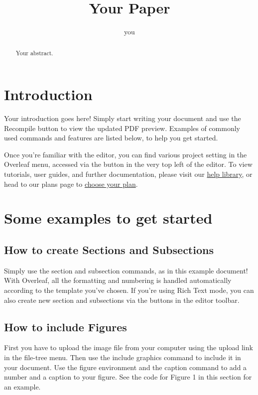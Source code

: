 \documentclass[10pt,english]{article}
\title{Your Paper}
\author{you}
\begin{document}
	 \maketitle
	 \begin{abstract}
	 	Your abstract.
	 \end{abstract}
	 \section{Introduction}
	 
	Your introduction goes here! Simply start writing your document and use the Recompile button to
	 view the updated PDF preview. Examples of commonly used commands and features are listed below,
	 to help you get started.
	 
	   Once you’re familiar with the editor, you can find various project setting in the Overleaf menu,
	 accessed via the button in the very top left of the editor. To view tutorials, user guides, and further
	 documentation, please visit our \href{https://www.overleaf.com/learn}{help library}, or head to our plans page to \href{https://www.overleaf.com/user/subscription/plans}{choose your plan}.
	 \section{Some examples to get started}
	  \subsection{How to create Sections and Subsections}
	  Simply use the section and subsection commands, as in this example document! With Overleaf, all
	  the formatting and numbering is handled automatically according to the template you’ve chosen. If
	  you’re using Rich Text mode, you can also create new section and subsections via the buttons in the
	  editor toolbar.
	  \subsection{How to include Figures}
	  First you have to upload the image file from your computer using the upload link in the file-tree menu.
	  Then use the include graphics command to include it in your document. Use the figure environment
	  and the caption command to add a number and a caption to your figure. See the code for Figure 1 in
	  this section for an example.
	  
\end{document}
